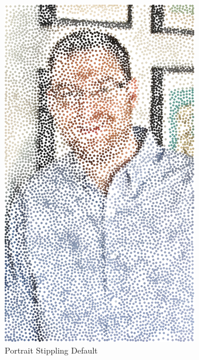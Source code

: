 \documentclass[11pt]{article}
\begin{document}
\begin{figure}[H]
\begin{subfigure}[b]{.48\linewidth}
		\includegraphics[width=\linewidth]{Portrait-7000-1}
		\caption{Portrait Stippling Default}
		\label{fig:traixn2}
	\end{subfigure}
	\begin{subfigure}[b]{.48\linewidth}

\end{subfigure}
\end{figure}
\end{document}

